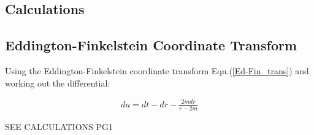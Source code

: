 \begin{appendix}

\section{Calculations}

\subsection{Eddington-Finkelstein Coordinate Transform}\label{Appendix_Ed-Fin_trans}

Using the Eddington-Finkelstein coordinate transform Eqn.(\ref{Ed-Fin_trans}) and working out the differential:

\begin{eqnarray*}
du = dt - dr - \frac{2m dr}{r - 2m}
\end{eqnarray*}

SEE CALCULATIONS PG1


\end{appendix}
